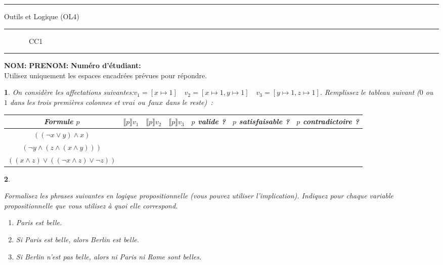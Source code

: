 \documentclass[a4paper,10pt,french]{article}
\newtheorem{exi}{}
\newenvironment{exo}{\begin{exi}\em}{\end{exi}}
\newcommand{\rsem}{\rrbracket}
\newcommand{\inte}[2]{\llbracket #1 \rsem {#2}}
\begin{document}
\vspace*{-1cm}
\hrule
\medbreak
\centerline{\textsf{O{\small utils} et L{\small ogique} (OL4)}}
\medbreak
\hrule
\medbreak
\centerline{\textsf{\phantom{(} ~~~~~~~CC1~~~~~~~\phantom{)}}}
\medbreak
\hrule

\bigskip
\bigskip

{\bf NOM:} \hspace*{4cm} {\bf PRENOM:} \hspace*{3cm} {\bf Numéro
  d'étudiant:}\\
Utilisez uniquement les espaces encadrées prévues pour répondre.

\begin{exo}
  On considère les affectations suivantes:$
v_1 = [ x\mapsto 1] \quad
v_2= [ x\mapsto 1, y\mapsto 1 ]  \quad
v_3= [ y\mapsto 1, z\mapsto 1 ]$.
Remplissez le tableau suivant ($0$ ou $1$ dans les trois premières colonnes et $vrai$ ou $\mathit{faux}$ dans le reste)~:
\begin{tabular}{|c|c|c|c|c|c|c|}
  \hline
    Formule $p$ &$\inte{p}{v_1}$&$\inte{p}{v_2}$&$\inte{p}{v_3}$&$p$ valide ?&$p$ satisfaisable ?&$p$ contradictoire ?\\[0.5ex]
    \hline
    $((\neg x \vee y) \land x)$&&&&&&\\[0.5ex]
    \hline
    $(\neg y \land (z \land (x \land y)))$&&&&&&\\[0.5ex]
    \hline
    $((x \land z) \vee ((\neg x \land z) \vee \neg z))$&&&&&&\\[0.5ex]
    \hline
  \end{tabular}
\end{exo}

\begin{exo}%

  Formalisez les phrases suivantes en logique propositionnelle
  (vous pouvez utiliser l'implication).
  Indiquez pour chaque variable propositionnelle que vous utilisez
  à quoi elle correspond.

  \begin{enumerate}
  \item Paris est belle.%
  \item Si Paris est belle, alors Berlin est belle.
  \item Si Berlin n'est pas belle, alors ni Paris ni Rome sont belles.
  \end{enumerate}

  \framebox[\textwidth]{
      \rule[-0.4cm]{0mm}{4cm}
  }

\end{exo}
\end{document}
